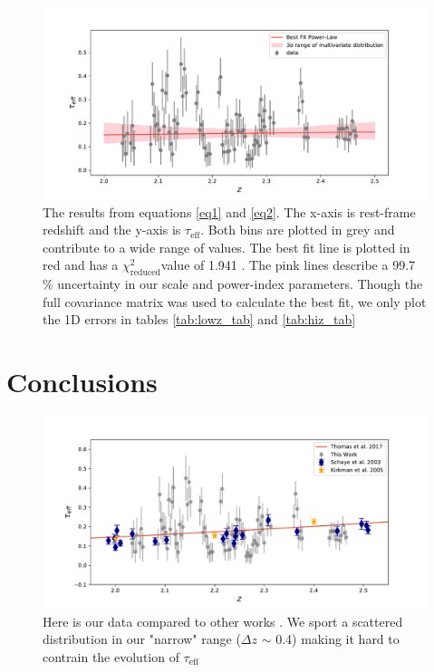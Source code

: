 \documentclass[preprint2,times,tighten]{aastex6}
\newcommand{\teff}{$\tau_\mathrm{eff}$\space}
\newcommand{\rchi}{$\chi^{2}_\mathrm{reduced}$}
\begin{document}
\begin{figure}[ht]
    \centering
    \includegraphics[scale = .5]{redshift_evolution.pdf}
    \caption{The results from equations \ref{eq1} and \ref{eq2}. The x-axis is rest-frame redshift and the y-axis is \teff. Both bins are plotted in grey and contribute to a wide range of values. The best fit line is plotted in red and has a \rchi value of 1.941 . The pink lines describe a 99.7 \% uncertainty in our scale and power-index parameters. Though the full covariance matrix was used to calculate the best fit, we only plot the 1D errors in tables \ref{tab:lowz_tab} and \ref{tab:hiz_tab}}
    \label{fig:scattertau}
\end{figure}

\section{Conclusions}
\label{sec:conclusions}

\begin{figure}[ht]
    \centering
    \includegraphics[scale = .5]{comptau.pdf}
    \caption{Here is our data compared to other works \cite{thomas_vimos_2017, schaye_metallicity_2003, kirkman_h_2005}. We sport a scattered distribution in our "narrow" range ($\Delta z$ $\sim$ 0.4) making it hard to contrain the evolution of \teff}
    \label{fig:comptau}
\end{figure}
\end{document}
